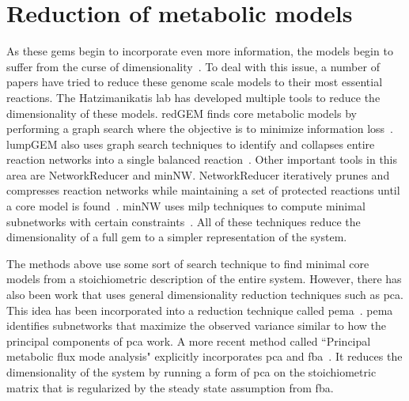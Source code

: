 \section{Reduction of metabolic models}
As these \glspl{gem} begin to incorporate even more information, the models begin to suffer from the curse of dimensionality~\cite{bellman2013dynamic}.
To deal with this issue, a number of papers have tried to reduce these genome scale models to their most essential reactions.
The Hatzimanikatis lab has developed multiple tools to reduce the dimensionality of these models.
redGEM finds core metabolic models by performing a graph search where the objective is to minimize information loss~\cite{ataman2017redgem}.
lumpGEM also uses graph search techniques to identify and collapses entire reaction networks into a single balanced reaction~\cite{ataman2017lumpgem}.
Other important tools in this area are NetworkReducer and minNW.
NetworkReducer iteratively prunes and compresses reaction networks while maintaining a set of protected reactions until a core model is found~\cite{erdrich2015algorithm}.
minNW uses \gls{milp} techniques to compute minimal subnetworks with certain constraints~\cite{rohl2017mixed}.
All of these techniques reduce the dimensionality of a full \gls{gem} to a simpler representation of the system.

The methods above use some sort of search technique to find minimal core models from a stoichiometric description of the entire system.
However, there has also been work that uses general dimensionality reduction techniques such as \gls{pca}.
This idea has been incorporated into a reduction technique called \gls{pema}~\cite{von2016principal}.
\gls{pema} identifies subnetworks that maximize the observed variance similar to how the principal components of \gls{pca} work.
A more recent method called ``Principal metabolic flux mode analysis" explicitly incorporates \gls{pca} and \gls{fba}~\cite{bhadra2017principal}.
It reduces the dimensionality of the system by running a form of \gls{pca} on the stoichiometric matrix that is regularized by the steady state assumption from \gls{fba}.


